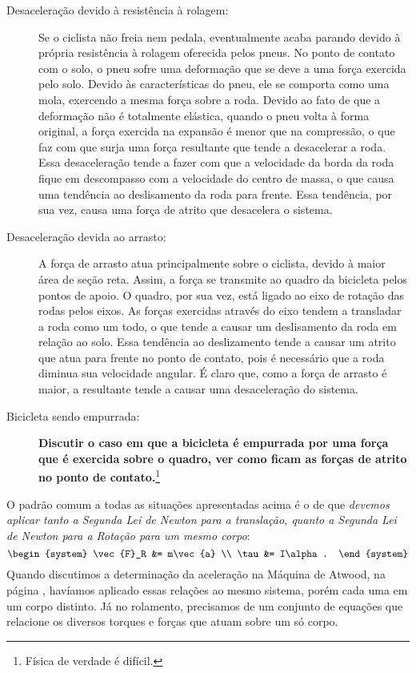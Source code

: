 \begin{description}
    \item[Desaceleração devido à resistência à rolagem:] Se o ciclista não freia nem pedala, eventualmente acaba parando devido à própria resistência à rolagem oferecida pelos pneus. No ponto de contato com o solo, o pneu sofre uma deformação que se deve a uma força exercida pelo solo. Devido às características do pneu, ele se comporta como uma mola, exercendo a mesma força sobre a roda. Devido ao fato de que a deformação não é totalmente elástica, quando o pneu volta à forma original, a força exercida na expansão é menor que na compressão, o que faz com que surja uma força resultante que tende a desacelerar a roda. Essa desaceleração tende a fazer com que a velocidade da borda da roda fique em descompasso com a velocidade do centro de massa, o que causa uma tendência ao deslisamento da roda para frente. Essa tendência, por sua vez, causa uma força de atrito que desacelera o sistema.
    \item[Desaceleração devida ao arrasto:] A força de arrasto atua principalmente sobre o ciclista, devido à maior área de seção reta. Assim, a força se transmite ao quadro da bicicleta pelos pontos de apoio. O quadro, por sua vez, está ligado ao eixo de rotação das rodas pelos eixos. As forças exercidas através do eixo tendem a transladar a roda como um todo, o que tende a causar um deslisamento da roda em relação ao solo. Essa tendência ao deslizamento tende a causar um atrito que atua para frente no ponto de contato, pois é necessário que a roda diminua sua velocidade angular. É claro que, como a força de arrasto é maior, a resultante tende a causar uma desaceleração do sistema.
    
    \item[Bicicleta sendo empurrada:] \textbf{Discutir o caso em que a bicicleta é empurrada por uma força que é exercida sobre o quadro, ver como ficam as forças de atrito no ponto de contato.}\footnote{Física de verdade é difícil.}
\end{description}

O padrão comum a todas as situações apresentadas acima é o de que \emph{devemos aplicar tanto a Segunda Lei de Newton para a translação, quanto a Segunda Lei de Newton para a Rotação para um mesmo corpo}:
\begin{equation}
\begin{system}
    \vec{F}_R &= m\vec{a} \\
    \tau &= I\alpha.
\end{system}
\end{equation}
%
Quando discutimos a determinação da aceleração na Máquina de Atwood, na página \pageref{Par:AcelMaqAtwood}, havíamos aplicado essas relações ao mesmo sistema, porém cada uma em um corpo distinto. Já no rolamento, precisamos de um conjunto de equações que relacione os diversos torques e forças que atuam sobre um só corpo.


